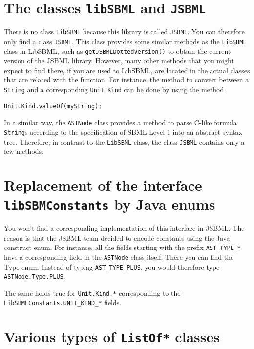 \documentclass[
  BCOR12mm,
  letterpaper,
  11pt,
  headsepline,
  pointlessnumbers,
  tablecaptionabove,
  headinclude,
  appendixprefix,
  idxtotoc,
  bibtotoc,
  twoside,
  titlepage
]{scrartcl}
\begin{document}
\section{The classes \texttt{libSBML} and \texttt{JSBML}}

There is no class \texttt{LibSBML} because this library is called
\texttt{JSBML}. You can therefore only find a class \texttt{JSBML}. This class
provides some similar methods as the \texttt{LibSBML} class in LibSBML, such as
\verb!getJSBMLDottedVersion()! to obtain the current version of the JSBML
library. However, many other methods that you might expect to find there, if you
are used to LibSBML, are located in the actual classes that are related with the
function. For instance, the method to convert between a \verb!String! and a
corresponding \verb!Unit.Kind! can be done by using the method
\begin{verbatim}
Unit.Kind.valueOf(myString);
\end{verbatim}
In a similar way, the \verb!ASTNode! class provides a method to parse C-like
formula \verb!String!s according to the specification of SBML Level 1 into an
abstract syntax tree. Therefore, in contrast to the  \texttt{LibSBML} class, the
class \texttt{JSBML} contains only a few methods.


\section{Replacement of the interface \texttt{libSBMConstants} by Java enums}

You won't find a corresponding implementation of this interface in 
JSBML. The reason is that the JSBML team decided to encode constants using the
Java construct enum. For instance, all the fields starting with the
prefix \verb!AST_TYPE_*! have a corresponding field in the \verb!ASTNode! class
itself. There you can find the Type enum. Instead of typing
\verb!AST_TYPE_PLUS!, you would therefore type \verb!ASTNode.Type.PLUS!.

The same holds true for \verb!Unit.Kind.*! corresponding to the 
\verb!LibSBMLConstants.UNIT_KIND_*! fields.


\section{Various types of \texttt{ListOf*} classes}
\end{document}
